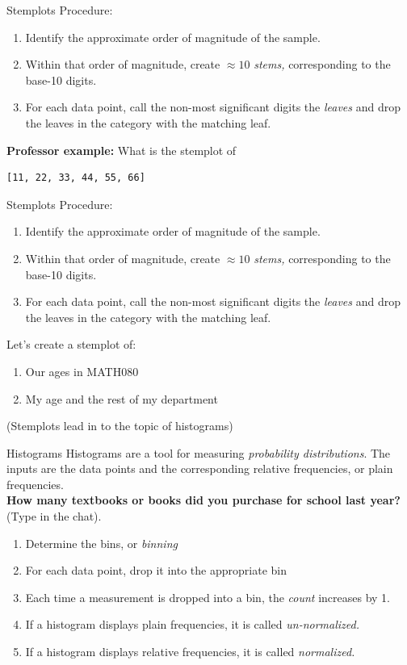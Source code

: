 \documentclass{beamer}
\begin{document}
\begin{frame}[fragile]{Stemplots}
\small
Procedure:
\begin{enumerate}
\item Identify the approximate order of magnitude of the sample.
\item Within that order of magnitude, create $\approx 10$ \textit{stems,} corresponding to the base-10 digits.
\item For each data point, call the non-most significant digits the \textit{leaves} and drop the leaves in the category with the matching leaf.
\end{enumerate}
\textbf{Professor example:} What is the stemplot of 
\begin{verbatim}
[11, 22, 33, 44, 55, 66]
\end{verbatim}
\end{frame}

\begin{frame}[fragile]{Stemplots}
\small
Procedure:
\begin{enumerate}
\item Identify the approximate order of magnitude of the sample.
\item Within that order of magnitude, create $\approx 10$ \textit{stems,} corresponding to the base-10 digits.
\item For each data point, call the non-most significant digits the \textit{leaves} and drop the leaves in the category with the matching leaf.
\end{enumerate}
Let's create a stemplot of:
\begin{enumerate}
\item Our ages in MATH080
\item My age and the rest of my department
\end{enumerate}
(Stemplots lead in to the topic of histograms)
\end{frame}

\begin{frame}[fragile]{Histograms}
\alert{Histograms} are a tool for measuring \textit{probability distributions}.  The inputs are the data points and the corresponding relative frequencies, or plain frequencies. \\ \vspace{0.5cm}
\textbf{How many textbooks or books did you purchase for school last year?} (Type in the chat).
\begin{enumerate}
\item Determine the bins, or \textit{binning}
\item For each data point, drop it into the appropriate bin
\item Each time a measurement is dropped into a bin, the \textit{count} increases by 1.
\item If a histogram displays plain frequencies, it is called \textit{un-normalized.}
\item If a histogram displays relative frequencies, it is called \textit{normalized.}
\end{enumerate}
\end{frame}
\end{document}
